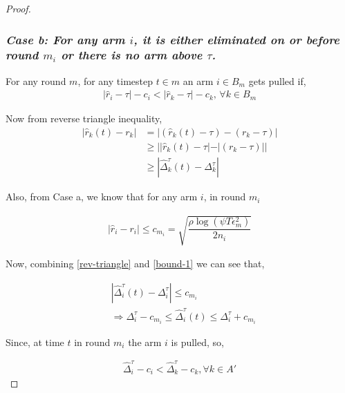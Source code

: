 \begin{proof}
\subsubsection{\textit{Case b: For any arm $i$, it is either eliminated on or before round $m_{i}$ or there is no arm above $\tau$.}}


	For any round $m$, for any timestep $t\in m$ an arm $i\in B_{m}$ gets pulled if,
\begin{align*}
|\hat{r}_{i} - \tau| - c_{i} < |\hat{r}_{k} - \tau| - c_{k} \text{, } \forall k\in B_{m}
\end{align*}

Now from reverse triangle inequality,
\begin{align}
|\hat{r}_{k}(t) - r_{k}|&=|(\hat{r}_{k}(t)-\tau) - (r_{k}-\tau)|\\
&\geq ||\hat{r}_{k}(t)-\tau|-|(r_{k}-\tau)||\\
&\geq |\hat{\Delta}_{k}^{\tau}(t) - \Delta_{k}^{\tau}| \label{rev-triangle}
\end{align}

Also, from Case a, we know that for any arm $i$, in round $m_{i}$

\begin{align}
|\hat{r}_{i} - r_{i}| \leq c_{m_{i}} =  \sqrt{\dfrac{\rho\log{(\psi T\epsilon_{m}^{2})}}{2 n_{i}}}  \label{bound-1}
\end{align}

Now, combining \ref{rev-triangle} and \ref{bound-1} we can see that,

\begin{align*}
&|\hat{\Delta}_{i}^{\tau}(t) - \Delta_{i}^{\tau}| \leq c_{m_{i}}\\
&\Rightarrow \Delta_{i}^{\tau} - c_{m_{i}} \leq \hat{\Delta}_{i}^{\tau}(t) \leq \Delta_{i}^{\tau} +c_{m_{i}}
\end{align*}

Since, at time $t$ in round $m_{i}$ the arm $i$ is pulled, so,

\begin{align*}
\hat{\Delta}_{i}^{\tau} - c_{i} < \hat{\Delta}_{k}^{\tau} - c_{k}, \forall k\in A'
\end{align*}

\end{proof}